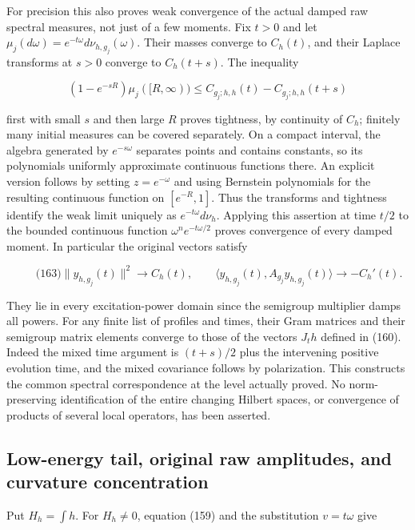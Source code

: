 For precision this also proves weak convergence of the actual damped raw
spectral measures, not just of a few moments. Fix \(t>0\) and let
\(\mu_j(d\omega)=e^{-t\omega}d\nu_{h,g_j}(\omega)\). Their masses
converge to \(C_h(t)\), and their Laplace transforms at \(s>0\) converge
to \(C_h(t+s)\). The inequality

\[
(1-e^{-sR})\mu_j([R,\infty))
       \le C_{g_j;h,h}(t)-C_{g_j;h,h}(t+s)
\]

first with small \(s\) and then large \(R\) proves tightness, by
continuity of \(C_h\); finitely many initial measures can be covered
separately. On a compact interval, the algebra generated by
\(e^{-s\omega}\) separates points and contains constants, so its
polynomials uniformly approximate continuous functions there. An
explicit version follows by setting \(z=e^{-\omega}\) and using
Bernstein polynomials for the resulting continuous function on
\([e^{-R},1]\). Thus the transforms and tightness identify the weak
limit uniquely as \(e^{-t\omega}d\nu_h\). Applying this assertion at
time \(t/2\) to the bounded continuous function
\(\omega^n e^{-t\omega/2}\) proves convergence of every damped moment.
In particular the original vectors satisfy

\[
\qquad\text{(163)}
 \|y_{h,g_j}(t)\|^2\longrightarrow C_h(t),\qquad
 \langle y_{h,g_j}(t),A_{g_j}y_{h,g_j}(t)\rangle
       \longrightarrow -C_h'(t).
\]

They lie in every excitation-power domain since the semigroup multiplier
damps all powers. For any finite list of profiles and times, their Gram
matrices and their semigroup matrix elements converge to those of the
vectors \(J_t h\) defined in (160). Indeed the mixed time argument is
\((t+s)/2\) plus the intervening positive evolution time, and the mixed
covariance follows by polarization. This constructs the common spectral
correspondence at the level actually proved. No norm-preserving
identification of the entire changing Hilbert spaces, or convergence of
products of several local operators, has been asserted.

\subsection{Low-energy tail, original raw amplitudes, and curvature
concentration}\label{full-local-spectrum-md-low-energy-tail-original-raw-amplitudes-and-curvature-concentration}

Put \(H_h=\int h\). For \(H_h\ne0\), equation (159) and the substitution
\(v=t\omega\) give

